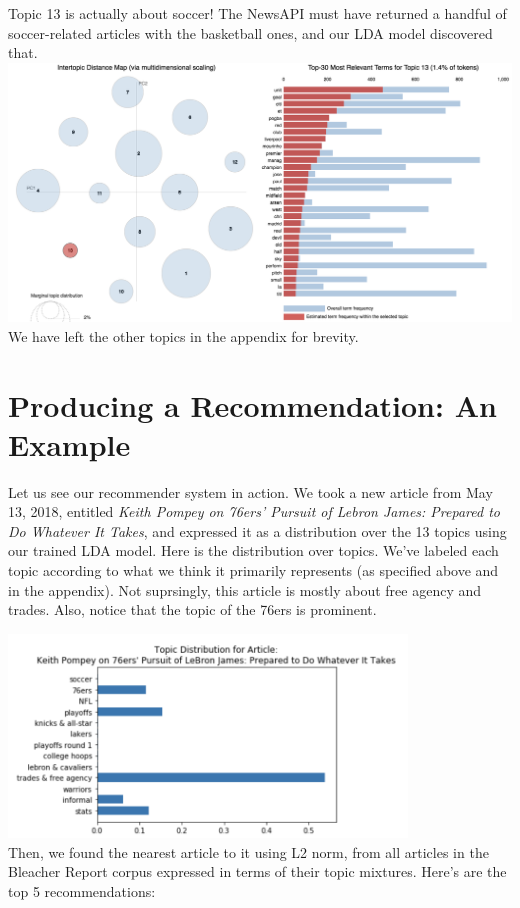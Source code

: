 \documentclass[11pt]{article}
\begin{document}
Topic 13 is actually about soccer!  The NewsAPI must have returned a handful of soccer-related articles with the basketball ones, and our LDA model discovered that. \\
\includegraphics[width=470pt]{13.png} \\

We have left the other topics in the appendix for brevity.

\section{Producing a Recommendation: An Example}
Let us see our recommender system in action.  We took a new article from May 13, 2018, entitled \textit{Keith Pompey on 76ers' Pursuit of Lebron James: Prepared to Do Whatever It Takes}, and expressed it as a distribution over the 13 topics using our trained LDA model.  Here is the distribution over topics.  We've labeled each topic according to what we think it primarily represents (as specified above and in the appendix). Not suprsingly, this article is mostly about free agency and trades. Also, notice that the topic of the 76ers is prominent. 

\includegraphics[width=300pt]{newarttopics.png}\\

Then, we found the nearest article to it using L2 norm, from all articles in the Bleacher Report corpus expressed in terms of their topic mixtures. Here's are the top 5 recommendations: \\
 
\end{document}
